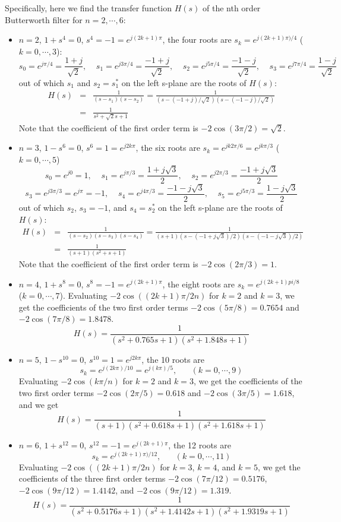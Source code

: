   Specifically, here we find the transfer function $H(s)$ of the nth order
  Butterworth filter for $n=2,\cdots,6$:
  \begin{itemize}
  \item $n=2$, $1+s^4=0$, $s^4=-1=e^{j(2k+1)\pi}$, the four roots are
    $s_k=e^{j(2k+1)\pi)/4}$ ($k=0,\cdots,3$):
    \[
    s_0=e^{j\pi/4}=\frac{1+j}{\sqrt{2}},\;\;\;\;
    s_1=e^{j3\pi/4}=\frac{-1+j}{\sqrt{2}},\;\;\;\;
    s_2=e^{j5\pi/4}=\frac{-1-j}{\sqrt{2}},\;\;\;\;
    s_3=e^{j7\pi/4}=\frac{1-j}{\sqrt{2}}
    \]
    out of which $s_1$ and $s_2=s_1^*$ on the left s-plane are the roots of 
    $H(s)$:
    \begin{eqnarray}
    H(s)&=&\frac{1}{(s-s_1)(s-s_2)}=\frac{1}{(s-(-1+j)/\sqrt{2})(s-(-1-j)/\sqrt{2})}
    \nonumber \\
    &=&\frac{1}{s^2+\sqrt{2}s+1}
    \nonumber
    \end{eqnarray}
    Note that the coefficient of the first order term is $-2\cos(3\pi/2)=\sqrt{2}$.
  \item $n=3$, $1-s^6=0$, $s^6=1=e^{j2k\pi}$, the six roots are
    $s_k=e^{j k2\pi/6}=e^{j k\pi/3}$ ($k=0,\cdots,5$)
    \[
    s_0=e^{j0}=1,\;\;\;\;
    s_1=e^{j\pi/3}=\frac{1+j\sqrt{3}}{2},\;\;\;\;s_2=e^{j2\pi/3}=\frac{-1+j\sqrt{3}}{2}
    \]
    \[
    s_3=e^{j3\pi/3}=e^{j\pi}=-1,\;\;\;\;
    s_4=e^{j4\pi/3}=\frac{-1-j\sqrt{3}}{2},\;\;\;\;s_5=e^{j5\pi/3}=\frac{1-j\sqrt{3}}{2}
    \]
    out of which $s_2$, $s_3=-1$, and $s_4=s_2^*$ on the left s-plane 
    are the roots of $H(s)$:
    \begin{eqnarray}
    H(s)&=&\frac{1}{(s-s_2)(s-s_3)(s-s_4)}
    =\frac{1}{(s+1)(s-(-1+j\sqrt{3})/2)(s-(-1-j\sqrt{3})/2)}
    \nonumber \\
    &=&\frac{1}{(s+1)(s^2+s+1)}
    \nonumber
    \end{eqnarray}
    Note that the coefficient of the first order term is $-2\cos(2\pi/3)=1$.
  \item $n=4$, $1+s^8=0$, $s^8=-1=e^{j(2k+1)\pi}$, the eight roots are
    $s_k=e^{j(2k+1)pi/8}$ ($k=0,\cdots,7$).
    Evaluating $-2\cos((2k+1)\pi/2n)$ for $k=2$ and $k=3$, we get the
    coefficients of the two first order terms
    $-2\cos(5\pi/8)=0.7654$ and $-2\cos(7\pi/8)=1.8478$.
    \[
    H(s)=\frac{1}{(s^2+0.765 s+1)(s^2+1.848 s+1)}
    \]
  \item $n=5$, $1-s^{10}=0$, $s^{10}=1=e^{j2k\pi}$, the 10 roots are
    \[
    s_k=e^{j(2k\pi)/10}=e^{j(k\pi)/5},\;\;\;\;\;\;(k=0,\cdots,9)
    \]
    Evaluating $-2\cos(k\pi/n)$ for $k=2$ and $k=3$, we get the
    coefficients of the two first order terms
    $-2\cos(2\pi/5)=0.618$ and $-2\cos(3\pi/5)=1.618$, and we get
    \[
    H(s)=\frac{1}{(s+1)(s^2+0.618 s+1)(s^2+1.618 s+1)}
    \]
  \item $n=6$, $1+s^{12}=0$, $s^{12}=-1=e^{j(2k+1)\pi}$, the 12 roots are
    \[
    s_k=e^{j(2k+1)\pi)/12},\;\;\;\;\;\;(k=0,\cdots,11)
    \]
    Evaluating $-2\cos((2k+1)\pi/2n)$ for $k=3$, $k=4$, and $k=5$,
    we get the coefficients of the three first order terms
    $-2\cos(7\pi/12)=0.5176$, $-2\cos(9\pi/12)=1.4142$, and
    $-2\cos(9\pi/12)=1.319$.
    \[
    H(s)=\frac{1}{(s^2+0.5176 s+1)(s^2+1.4142 s+1)(s^2+1.9319 s+1)}
    \]
  \end{itemize}
